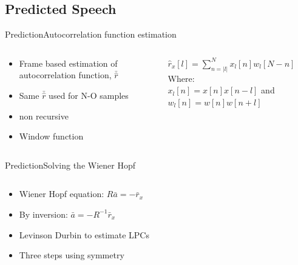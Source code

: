 \subsection{Predicted Speech}
\begin{frame}{Prediction}{Autocorrelation function estimation}
	\begin{columns}
		\begin{column}{0.5\textwidth}
			\begin{itemize}
				\item Frame based estimation of autocorrelation function, $\bar{\hat{r}}$
				\item Same  $\bar{\hat{r}}$ used for N-O samples
				\item non recursive
				\item Window function
			\end{itemize}
		\end{column}
		\begin{column}{0.5\textwidth} 
			$\hat{r}_x[l] = \sum^{N}_{n=\left| l\right|} x_l[n]w_l[N-n]$\\
			\vspace{5mm}
			Where: \\
			$x_l[n]=x[n]x[n-l]$ and $w_l[n]=w[n]w[n+l]$
		\end{column}
	\end{columns}
\end{frame}

\begin{frame}{Prediction}{Solving the Wiener Hopf}
	\begin{columns}
		\begin{column}{0.4\textwidth}
			\begin{itemize}
				\item Wiener Hopf equation: $R  \bar{a} = -\bar{r}_x$
				\item By inversion: $\bar{a} = -R^{-1} \bar{r}_x$
				\item Levinson Durbin to estimate LPCs 
				\item Three steps using symmetry
			\end{itemize}
			
		\end{column}
		\begin{column}{0.6\textwidth} 
				\resizebox{1.0\columnwidth}{!}{	
				
			}	
		\end{column}
	\end{columns}
\end{frame}


